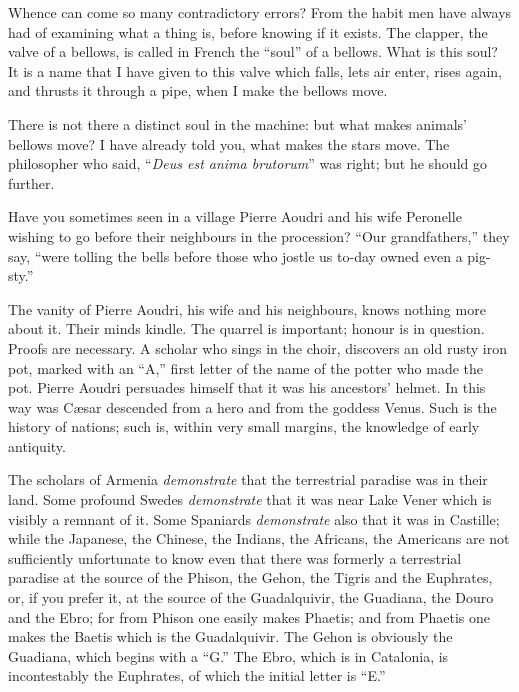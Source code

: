 Whence can come so many contradictory errors? From the habit men have
always had of examining what a thing is, before knowing if it exists.
The clapper, the valve of a bellows, is called in French the \enquote{soul} of a
bellows. What is this soul? It is a name that I have given to this valve
which falls, lets air enter, rises again, and thrusts it through a pipe,
when I make the bellows move.

There is not there a distinct soul in the machine: but what makes
animals' bellows move? I have already told you, what makes the stars
move. The philosopher who said, \enquote{\textit{Deus est anima brutorum}} was right;
but he should go further.






Have you sometimes seen in a village Pierre Aoudri and his wife
Peronelle wishing to go before their neighbours in the procession? \enquote{Our
grandfathers,} they say, \enquote{were tolling the bells before those who jostle
us to-day owned even a pig-sty.}

The vanity of Pierre Aoudri, his wife and his neighbours, knows nothing
more about it. Their minds kindle. The quarrel is important; honour is
in question. Proofs are necessary. A scholar who sings in the choir,
discovers an old rusty iron pot, marked with an \enquote{A,} first letter of the
name of the potter who made the pot. Pierre Aoudri persuades himself
that it was his ancestors' helmet. In this way was Cæsar descended from
a hero and from the goddess Venus. Such is the history of nations; such
is, within very small margins, the knowledge of early antiquity.

The scholars of Armenia \textit{demonstrate} that the terrestrial paradise was
in their land. Some profound Swedes \textit{demonstrate} that it was near Lake
Vener which is visibly a remnant of it. Some Spaniards \textit{demonstrate}
also that it was in Castille; while the Japanese, the Chinese, the
Indians, the Africans, the Americans are not sufficiently unfortunate to
know even that there was formerly a terrestrial paradise at the source
of the Phison, the Gehon, the Tigris and the Euphrates, or, if you
prefer it, at the source of the Guadalquivir, the Guadiana, the Douro
and the Ebro; for from Phison one easily makes Phaetis; and from Phaetis
one makes the Baetis which is the Guadalquivir. The Gehon is obviously
the Guadiana, which begins with a \enquote{G.} The Ebro, which is in Catalonia,
is incontestably the Euphrates, of which the initial letter is \enquote{E.}

